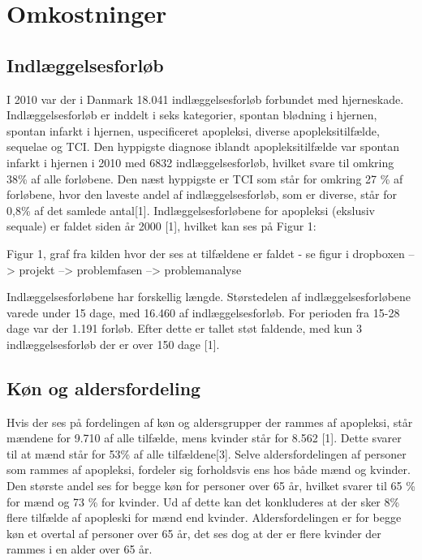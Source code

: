 \section{Omkostninger}

\subsection{Indlæggelsesforløb}
I 2010 var der i Danmark 18.041 indlæggelsesforløb forbundet med hjerneskade. Indlæggelsesforløb er inddelt i seks kategorier, spontan blødning i hjernen, spontan infarkt i hjernen, uspecificeret apopleksi, diverse apopleksitilfælde, sequelae og TCI.  Den hyppigste diagnose iblandt apopleksitilfælde var spontan infarkt i hjernen i 2010 med 6832 indlæggelsesforløb, hvilket svare til omkring 38\% af alle forløbene. Den næst hyppigste er TCI som står for omkring 27 \% af forløbene, hvor den laveste andel af indlæggelsesforløb, som er diverse, står for 0,8\% af det samlede antal[1].  Indlæggelsesforløbene for apopleksi (ekslusiv sequale) er faldet siden år 2000 [1], hvilket kan ses på Figur 1:

Figur 1, graf fra kilden hvor der ses at tilfældene er faldet  - se figur i dropboxen --> projekt --> problemfasen --> problemanalyse

Indlæggelsesforløbene har forskellig længde. Størstedelen af indlæggelsesforløbene varede under 15 dage, med 16.460 af indlæggelsesforløb. For perioden fra 15-28 dage var der 1.191 forløb. Efter dette er tallet støt faldende, med kun 3 indlæggelsesforløb der er over 150 dage [1].

\subsection{Køn og aldersfordeling}
Hvis der ses på fordelingen af køn og aldersgrupper der rammes af apopleksi, står mændene for 9.710 af alle tilfælde, mens kvinder står for 8.562 [1]. Dette svarer til at mænd står for 53\% af alle tilfældene[3]. Selve aldersfordelingen af personer som rammes af apopleksi, fordeler sig forholdsvis ens hos både mænd og kvinder. Den største andel ses for begge køn for personer over 65 år, hvilket svarer til 65 \% for mænd og  73 \% for kvinder. Ud af dette kan det konkluderes at der sker 8\% flere tilfælde af apopleski for mænd end kvinder. Aldersfordelingen er for begge køn et overtal af personer over 65 år, det ses dog at der er flere kvinder der rammes i en alder over 65 år. %

